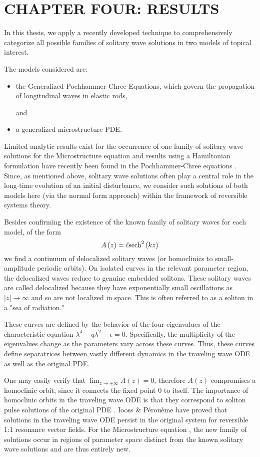 \chapter{CHAPTER FOUR: RESULTS} \label{chapter_4}

In this thesis, we apply a recently developed technique to
comprehensively categorize all possible families of solitary wave
solutions in two models of topical interest.

The models considered are:
\begin{itemize}
\item the Generalized Pochhammer-Chree Equations, which  govern the propagation of longitudinal waves in elastic rods,

and

\item a generalized microstructure PDE.
\end{itemize}

Limited analytic results exist for the occurrence of one family of  solitary
wave solutions for the Microstructure equation and results using a Hamiltonian
formulation have recently been found in the Pochhammer-Chree equations \cite{LiZhang}. Since, as
mentioned above, solitary wave solutions often play a central role in the
long-time evolution of an initial disturbance, we consider such solutions of
both models here (via the normal form approach) within the framework of
reversible systems theory.

Besides confirming the existence of the known family of solitary waves for each
model, of the form
\begin{equation} 
A\left(z\right) = \ell \space \mathrm{sech}^2\left(k z\right)
\end{equation}
we find a continuum of delocalized solitary waves (or homoclinics to
small-amplitude periodic orbits).  On isolated curves in the relevant parameter
region, the delocalized waves reduce to genuine embedded solitons. 
These solitary waves are called delocalized because they have exponentially
small oscillations as $|z|\rightarrow\infty$ and so are not localized in space.
This is often referred to as a soliton in a "sea of radiation."

These curves are defined by the behavior of the four eigenvalues of the characteristic
equation $ \lambda^4 - q \lambda^2 - \epsilon =  0$. Specifically, the 
multiplicity of the eigenvalues change as the parameters vary across these curves.
Thus, these curves define separatrices between vastly different dynamics in 
the traveling wave ODE as well as the original PDE.

One may easily verify that $\lim_{z\rightarrow\pm\infty} A(z) = 0$, therefore
$A(z)$ compromises a homoclinic orbit, since it connects the fixed point $0$ to
itself. The importance of homoclinic orbits in the traveling wave ODE is that
they correspond to soliton pulse solutions of the original PDE \cite{IA}. Iooss
\& P\'erou\`eme have proved that solutions in the traveling wave ODE persist in
the original system \cite{IP} for reversible 1:1 resonance vector fields.  For
the Microstructure equation , the new family of solutions occur in regions of
parameter space distinct from the known solitary wave solutions and are thus
entirely new. 

